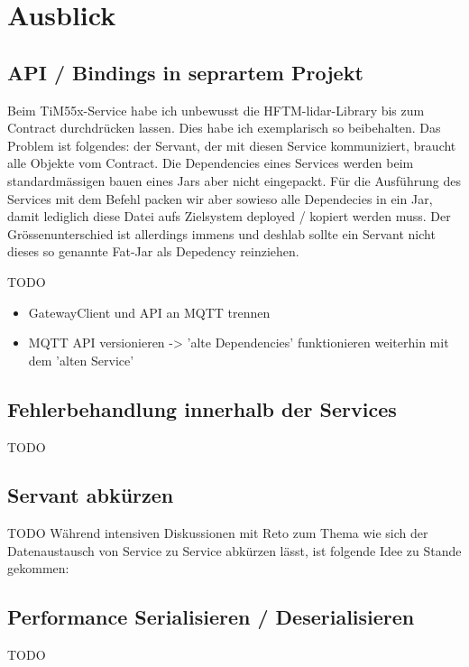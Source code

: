 \chapter{Ausblick}
\section{API / Bindings in seprartem Projekt}
\label{sec:separatebindings}
Beim TiM55x-Service habe ich unbewusst die HFTM-\acrshort{lidar}-Library bis zum Contract durchdrücken lassen. Dies habe ich exemplarisch so beibehalten. Das Problem ist folgendes: der Servant, der mit diesen Service kommuniziert, braucht alle Objekte vom Contract. Die Dependencies eines Services werden beim standardmässigen bauen eines Jars aber nicht eingepackt. Für die Ausführung des Services mit dem Befehl  packen wir aber sowieso alle Dependecies in ein Jar, damit lediglich diese Datei aufs Zielsystem deployed / kopiert werden muss. Der Grössenunterschied ist allerdings immens und deshlab sollte ein Servant nicht dieses so genannte Fat-Jar als Depedency reinziehen.

TODO

\begin{itemize}
	\item
	GatewayClient und API an MQTT trennen
	
	\item
	MQTT API versionieren -> 'alte Dependencies' funktionieren weiterhin mit dem 'alten Service'
\end{itemize}

\section{Fehlerbehandlung innerhalb der Services}
TODO

\section{Servant abkürzen}
TODO
Während intensiven Diskussionen mit Reto zum Thema wie sich der Datenaustausch von Service zu Service abkürzen lässt, ist folgende Idee zu Stande gekommen:

\section{Performance Serialisieren / Deserialisieren}
TODO
